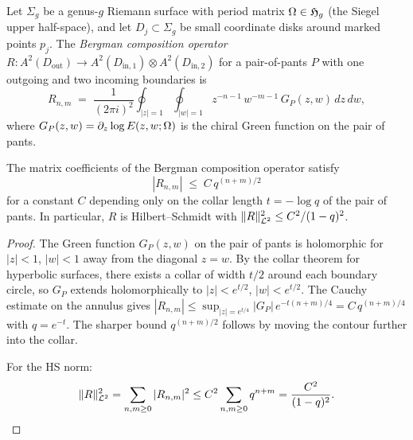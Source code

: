 \begin{definition}%
\label{def:thqg-X-bergman-composition}%
%
Let $\Sigma_g$ be a genus-$g$ Riemann surface with period
matrix $\Omega \in \mathfrak{H}_g$ (the Siegel upper half-space),
and let $D_j \subset \Sigma_g$ be small coordinate disks around
marked points $p_j$. The \emph{Bergman composition operator}
$R \colon A^2(D_{\mathrm{out}}) \to
A^2(D_{\mathrm{in},1}) \otimes A^2(D_{\mathrm{in},2})$
for a pair-of-pants $P$ with one outgoing and two incoming
boundaries is
\begin{equation}\label{eq:thqg-X-bergman-composition}
R_{n,m}
\;=\;
\frac{1}{(2\pi i)^2}
\oint_{|z|=1} \oint_{|w|=1}
z^{-n-1}\,w^{-m-1}\,
G_P(z,w)\,dz\,dw,
\end{equation}
where $G_P(z,w) = \partial_z \log E(z,w;\Omega)$ is the
chiral Green function on the pair of pants.
\end{definition}

\begin{lemma}%
\label{lem:thqg-X-composition-decay}%
%
The matrix coefficients of the Bergman composition operator satisfy
\begin{equation}\label{eq:thqg-X-composition-bound}
|R_{n,m}|
\;\leq\;
C\,q^{(n+m)/2}
\end{equation}
for a constant $C$ depending only on the collar length
$t = -\log q$ of the pair of pants. In particular,
$R$ is Hilbert--Schmidt with
$\|R\|_{\mathcal{L}^2}^2 \leq C^2/(1-q)^2$.
\end{lemma}

\begin{proof}
The Green function $G_P(z,w)$ on the pair of pants is holomorphic
for $|z| < 1$, $|w| < 1$ away from the diagonal $z = w$.
By the collar theorem for hyperbolic surfaces, there exists a
collar of width $t/2$ around each boundary circle, so $G_P$ extends
holomorphically to $|z| < e^{t/2}$, $|w| < e^{t/2}$.
The Cauchy estimate on the annulus gives
$|R_{n,m}| \leq \sup_{|z|=e^{t/4}} |G_P|\, e^{-t(n+m)/4}
= C\,q^{(n+m)/4}$ with $q = e^{-t}$.
The sharper bound $q^{(n+m)/2}$ follows by moving the contour
further into the collar.

For the HS norm:
\[
\|R\|_{\mathcal{L}^2}^2
= \sum_{n,m \geq 0} |R_{n,m}|^2
\leq C^2 \sum_{n,m \geq 0} q^{n+m}
= \frac{C^2}{(1-q)^2}.
\qedhere
\]
\end{proof}

